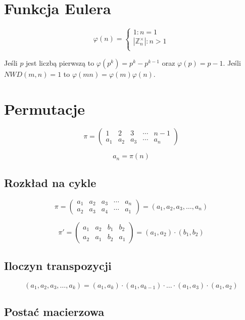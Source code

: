 \documentclass{../notatki}
\begin{document}
\section{Funkcja Eulera}

$$
\varphi(n) =
\begin{cases}
  1 : n = 1\\
  |\mathbb{Z}_n^\times| : n > 1\\
\end{cases}
$$

Jeśli $p$ jest liczbą pierwszą to $\varphi(p^k) = p^k - p^{k-1}$ oraz
$\varphi(p) = p - 1$. Jeśli $NWD(m, n) = 1$ to $\varphi(mn) =
\varphi(m)\varphi(n)$.


\section{Permutacje}

$$
\pi =
\begin{pmatrix}
  1   & 2   & 3   & \cdots & n-1   \\
  a_1 & a_2 & a_3 & \cdots &  a_n
\end{pmatrix}
$$

$$
a_n = \pi(n)
$$

\subsection{Rozkład na cykle}

$$
\pi =
\begin{pmatrix}
  a_1 & a_2 & a_3 & \cdots & a_n   \\
  a_2 & a_3 & a_4 & \cdots & a_1
\end{pmatrix}
= (a_1, a_2, a_3, \dots, a_n)
$$

$$
\pi' =
\begin{pmatrix}
  a_1 & a_2 & b_1 & b_2   \\
  a_2 & a_1 & b_2 & a_1
\end{pmatrix}
= (a_1, a_2) \cdot (b_1, b_2)
$$

\subsection{Iloczyn transpozycji}

$$
(a_1, a_2, a_3, \dots, a_k) = (a_1, a_k) \cdot (a_1, a_{k-1}) \cdot
\dots \cdot (a_1, a_3) \cdot (a_1, a_2)
$$

\subsection{Postać macierzowa}
\end{document}
